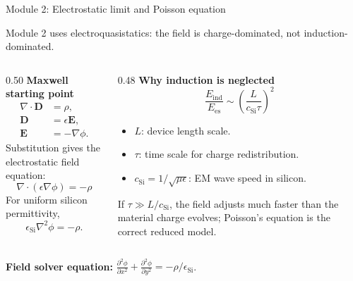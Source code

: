 \documentclass[aspectratio=169,9pt]{beamer}
\newcommand{\grad}{\nabla}
\newcommand{\divg}{\nabla\!\cdot}
\newcommand{\E}{\bm{E}}
\newcommand{\epsSi}{\epsilon_{\mathrm{Si}}}
\newcommand{\vect}[1]{\bm{#1}}
\begin{document}
\begin{frame}{Module 2: Electrostatic limit and Poisson equation}
\footnotesize
\vspace{-3mm}
\begin{bluebox}
\centering
Module 2 uses electroquasistatics: the field is charge-dominated, not induction-dominated.
\end{bluebox}

\vspace{1mm}
\begin{columns}[T,totalwidth=\textwidth]
\begin{column}{0.50\textwidth}
\textbf{Maxwell starting point}
\begin{align*}
\divg \vect{D} &= \rho, \\
\vect{D} &= \epsilon \E, \\
\E &= -\grad \phi.
\end{align*}
Substitution gives the electrostatic field equation:
\begin{equation*}
\boxed{\divg(\epsilon \grad \phi) = -\rho}
\end{equation*}
For uniform silicon permittivity,
\begin{equation*}
\boxed{\epsSi \grad^2\phi=-\rho.}
\end{equation*}
\end{column}
\begin{column}{0.48\textwidth}
\textbf{Why induction is neglected}
\begin{equation*}
\boxed{\frac{E_{\mathrm{ind}}}{E_{\mathrm{es}}}\sim
\left(\frac{L}{c_{\mathrm{Si}}\tau}\right)^2}
\end{equation*}
\begin{itemize}\setlength\itemsep{0.4mm}
\item \(L\): device length scale.
\item \(\tau\): time scale for charge redistribution.
\item \(c_{\mathrm{Si}}=1/\sqrt{\mu\epsilon}\): EM wave speed in silicon.
\end{itemize}
\small
If \(\tau \gg L/c_{\mathrm{Si}}\), the field adjusts much faster than the material charge evolves; Poisson's equation is the correct reduced model.
\end{column}
\end{columns}

\vspace{1mm}
\begin{greenbox}
\centering\scriptsize
\textbf{Field solver equation:}\quad
\(\displaystyle \frac{\partial^2\phi}{\partial x^2}+\frac{\partial^2\phi}{\partial y^2}= -\rho/\epsSi\).
\end{greenbox}
\end{frame}
\end{document}
